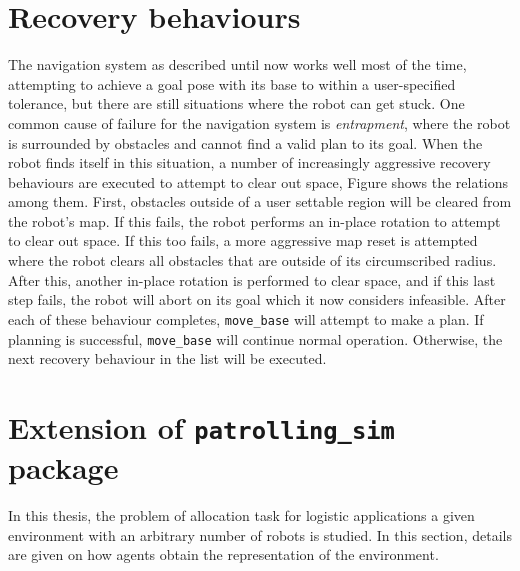 \section{Recovery behaviours}
The navigation system as described until now works well most of the time,
attempting to achieve a goal pose with its base to within a user-specified
tolerance, but there are still situations where the robot can get stuck.
One common cause of failure for the navigation system is \textit{entrapment},
where the robot is surrounded by obstacles and cannot find a valid plan to its goal.
When the robot finds itself in this situation, a number of increasingly
aggressive recovery behaviours are executed to attempt to clear out space,
Figure %
shows the relations among them. First, obstacles outside of a user 
settable region will be cleared from the robot’s map.
If this fails, the robot performs an in-place rotation to attempt to clear out
space. If this too fails, a more aggressive map reset is attempted where the
robot clears all obstacles that are outside of its circumscribed radius. After
this, another in-place rotation is performed to clear space, and if this last
step fails, the robot will abort on its goal which it now considers infeasible.
After each of these behaviour completes, \texttt{move\_base} will attempt to make
a plan. If planning is successful, \texttt{move\_base} will continue normal operation.
Otherwise, the next recovery behaviour in the list will be executed.

\section{Extension of \texttt{patrolling\_sim} package}
In this thesis, the problem of allocation task for logistic applications a given 
environment with an arbitrary number of robots is studied. In this section, 
details are given on how agents obtain the representation of the environment.

